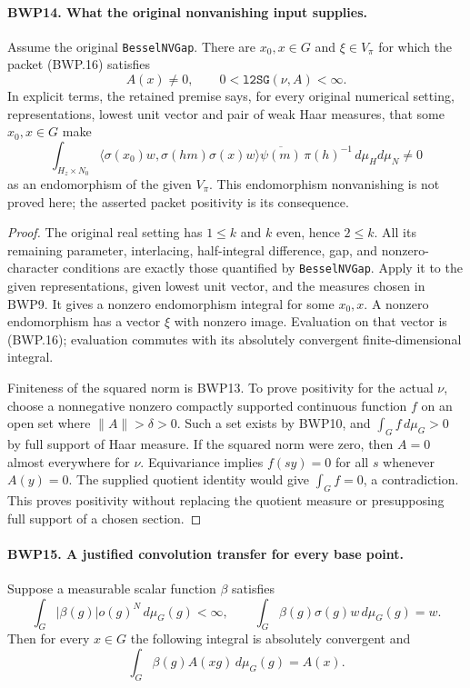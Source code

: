 \paragraph{BWP14. What the original nonvanishing input supplies.}
\label{claim:BWP14}
Assume the original \texttt{BesselNVGap}.  There are
\(x_0,x\in G\) and \(\xi\in V_\pi\) for which the packet
(BWP.16) satisfies
\[
 A(x)\ne0,\qquad 0<\texttt{l2SG}(\nu,A)<\infty.
 \tag{BWP.21}
\]
In explicit terms, the retained premise says, for every original
numerical setting, representations, lowest unit vector and pair of
weak Haar measures, that some \(x_0,x\in G\) make
\[
 \int_{H_z\times N_0}
 \langle\sigma(x_0)w,\sigma(hm)\sigma(x)w\rangle
 \overline{\psi(m)}\,\pi(h)^{-1}\,d\mu_Hd\mu_N\ne0
 \tag{BWP.30}
\]
as an endomorphism of the given \(V_\pi\).  This endomorphism
nonvanishing is not proved here; the asserted packet positivity is
its consequence.

\begin{proof}
The original real setting has \(1\le k\) and \(k\) even,
hence \(2\le k\).  All its remaining parameter, interlacing,
half-integral difference, gap, and nonzero-character conditions are
exactly those quantified by \texttt{BesselNVGap}.  Apply it to the
given representations, given lowest unit vector, and the measures
chosen in BWP9.  It gives a nonzero endomorphism integral for some
\(x_0,x\).  A nonzero endomorphism has a vector \(\xi\) with
nonzero image.  Evaluation on that vector is (BWP.16); evaluation
commutes with its absolutely convergent finite-dimensional integral.

Finiteness of the squared norm is BWP13.  To prove positivity for the
actual \(\nu\), choose a nonnegative nonzero compactly supported
continuous function \(f\) on an open set where \(\|A\|>\delta>0\).
Such a set exists by BWP10, and \(\int_G f\,d\mu_G>0\)
by full support of Haar measure.  If the squared norm were zero,
then \(A=0\) almost everywhere for \(\nu\).  Equivariance
implies \(f(sy)=0\) for all \(s\) whenever \(A(y)=0\).
The supplied quotient identity would give \(\int_G f=0\), a
contradiction.  This proves positivity without replacing the quotient
measure or presupposing full support of a chosen section.
\end{proof}

\paragraph{BWP15. A justified convolution transfer for every base point.}
\label{claim:BWP15}
Suppose a measurable scalar function \(\beta\) satisfies
\[
 \int_G|\beta(g)|o(g)^N\,d\mu_G(g)<\infty,
 \qquad \int_G\beta(g)\sigma(g)w\,d\mu_G(g)=w.
 \tag{BWP.22}
\]
Then for every \(x\in G\) the following integral is absolutely
convergent and
\[
 \int_G\beta(g)A(xg)\,d\mu_G(g)=A(x).
 \tag{BWP.23}
\]


